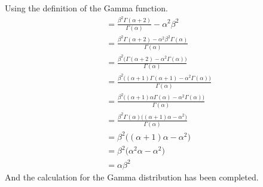 \newpage\noindent
Using the definition of the Gamma function.
\begin{align*}
    &= \frac{\beta^{2}\Gamma(\alpha + 2)}{\Gamma(\alpha)} - \alpha^2\beta^2 \\
    &= \frac{\beta^{2}\Gamma(\alpha + 2) - \alpha^2\beta^2\Gamma(\alpha)}{\Gamma(\alpha)} \\
    &= \frac{\beta^{2}\big(\Gamma(\alpha + 2) - \alpha^2\Gamma(\alpha)\big)}{\Gamma(\alpha)} \\
    &= \frac{\beta^{2}\big((\alpha + 1)\Gamma(\alpha + 1) - \alpha^2\Gamma(\alpha)\big)}{\Gamma(\alpha)} \\
    &= \frac{\beta^{2}\big((\alpha + 1)\alpha\Gamma(\alpha) - \alpha^2\Gamma(\alpha)\big)}{\Gamma(\alpha)} \\
    &= \frac{\beta^{2}\Gamma(\alpha)\big((\alpha + 1)\alpha - \alpha^2\big)}{\Gamma(\alpha)} \\
    &= \beta^{2}\big((\alpha + 1)\alpha - \alpha^2\big)\\
    &= \beta^{2}\big(\alpha^2 \alpha - \alpha^2\big) \\
    &= \alpha\beta^2
\end{align*}
And the calculation for the Gamma distribution has been completed.

